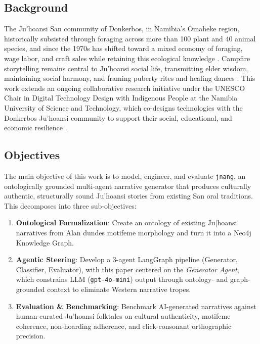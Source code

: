 \documentclass[pdflatex,sn-mathphys-num]{sn-jnl}%
\newcommand{\juhoansi}{\mbox{Ju\textbar{}'hoansi}}%
\theoremstyle{thmstyleone}%
\theoremstyle{thmstyletwo}%
\theoremstyle{thmstylethree}%
\begin{document}
\subsection{Background}
The \juhoansi{} San community of Donkerbos, in Namibia's Omaheke region, historically subsisted through foraging across more than 100 plant and 40 animal species, and since the 1970s has shifted toward a mixed economy of foraging, wage labor, and craft sales while retaining this ecological knowledge \cite{wiessner2014}. Campfire storytelling remains central to \juhoansi{} social life, transmitting elder wisdom, maintaining social harmony, and framing puberty rites and healing dances \cite{wiessner2014,keeney2013reentry}. This work extends an ongoing collaborative research initiative under the UNESCO Chair in Digital Technology Design with Indigenous People at the Namibia University of Science and Technology, which co-designs technologies with the Donkerbos \juhoansi{} community to support their social, educational, and economic resilience \cite{Kays2023}.

\subsection{Objectives}
The main objective of this work is to model, engineer, and evaluate \texttt{jnang}, an ontologically grounded multi-agent narrative generator that produces culturally authentic, structurally sound \juhoansi{} stories from existing San oral traditions. This decomposes into three sub-objectives:

\begin{enumerate}
    \item \textbf{Ontological Formalization}: Create an ontology  of existing Ju|hoansi narratives from Alan dundes  motifeme morphology and turn it into a  Neo4j Knowledge Graph.
    \item \textbf{Agentic Steering}: Develop a 3-agent LangGraph pipeline (Generator, Classifier, Evaluator), with this paper centered on the \textit{Generator Agent}, which constrains LLM (\texttt{gpt-4o-mini}) output through ontology- and graph-grounded context to eliminate Western narrative tropes.
    \item \textbf{Evaluation \& Benchmarking}: Benchmark AI-generated narratives against human-curated \juhoansi{} folktales on cultural authenticity, motifeme coherence, non-hoarding adherence, and click-consonant orthographic precision.
\end{enumerate}
\end{document}
